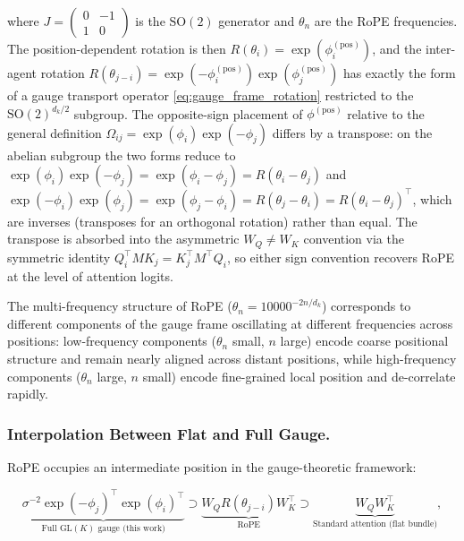 \documentclass[twoside,11pt]{article}
\begin{document}
where $J = \left(\begin{smallmatrix} 0 & -1 \\ 1 & 0 \end{smallmatrix}\right)$ is the $\mathrm{SO}(2)$ generator and $\theta_n$ are the RoPE frequencies. The position-dependent rotation is then $R(\theta_i) = \exp(\phi_i^{(\mathrm{pos})})$, and the inter-agent rotation $R(\theta_{j-i}) = \exp(-\phi_i^{(\mathrm{pos})})\exp(\phi_j^{(\mathrm{pos})})$ has exactly the form of a gauge transport operator \eqref{eq:gauge_frame_rotation} restricted to the $\mathrm{SO}(2)^{d_k/2}$ subgroup. The opposite-sign placement of $\phi^{(\mathrm{pos})}$ relative to the general definition $\Omega_{ij} = \exp(\phi_i)\exp(-\phi_j)$ differs by a transpose: on the abelian subgroup the two forms reduce to $\exp(\phi_i)\exp(-\phi_j) = \exp(\phi_i - \phi_j) = R(\theta_i - \theta_j)$ and $\exp(-\phi_i)\exp(\phi_j) = \exp(\phi_j - \phi_i) = R(\theta_j - \theta_i) = R(\theta_i - \theta_j)^{\top}$, which are inverses (transposes for an orthogonal rotation) rather than equal. The transpose is absorbed into the asymmetric $W_Q \neq W_K$ convention via the symmetric identity $Q_i^{\top} M K_j = K_j^{\top} M^{\top} Q_i$, so either sign convention recovers RoPE at the level of attention logits. 

The multi-frequency structure of RoPE ($\theta_n = 10000^{-2n/d_k}$) corresponds to different components of the gauge frame oscillating at different frequencies across positions: low-frequency components ($\theta_n$ small, $n$ large) encode coarse positional structure and remain nearly aligned across distant positions, while high-frequency components ($\theta_n$ large, $n$ small) encode fine-grained local position and de-correlate rapidly. 

\subsubsection{Interpolation Between Flat and Full Gauge.}

RoPE occupies an intermediate position in the gauge-theoretic framework:

\begin{equation}
\underbrace{\sigma^{-2}\exp(-\phi_j)^\top\exp(\phi_i)^\top}_{\text{Full GL}(K)\text{ gauge (this work)}} \supset 
\underbrace{W_Q R(\theta_{j-i}) W_K^\top}_{\text{RoPE}} \supset 
\underbrace{W_Q W_K^\top}_{\text{Standard attention (flat bundle)}},
\end{equation}
\end{document}
